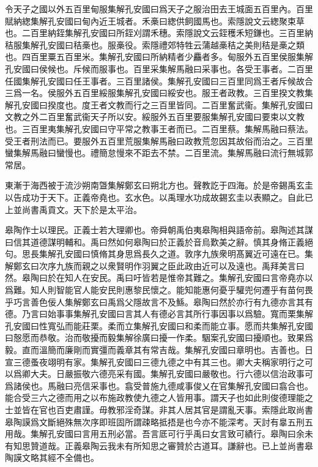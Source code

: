 令天子之國以外五百里甸服集解孔安國曰爲天子之服治田去王城面五百里內。百里賦納緫集解孔安國曰甸內近王城者。禾槀曰緫供飼國馬也。索隱說文云緫聚束草也。二百里納銍集解孔安國曰所銍刈謂禾穗。索隱說文云銍穫禾短鎌也。三百里納秸服集解孔安國曰秸槀也。服槀役。索隱禮郊特牲云蒲越槀秸之美則秸是槀之類也。四百里粟五百里米。集解孔安國曰所納精者少麤者多。甸服外五百里侯服集解孔安國曰侯候也。斥候而服事也。百里采集解馬融曰采事也。各受王事者。二百里任國集解孔安國曰任王事者。三百里諸侯。集解孔安國曰三百里同爲王者斥候故合三爲一名。侯服外五百里綏服集解孔安國曰綏安也。服王者政教。三百里揆文教集解孔安國曰揆度也。度王者文教而行之三百里皆同。二百里奮武衞。集解孔安國曰文教之外二百里奮武衞天子所以安。綏服外五百里要服集解孔安國曰要束以文教也。三百里夷集解孔安國曰守平常之教事王者而已。二百里蔡。集解馬融曰蔡法。受王者刑法而已。要服外五百里荒服集解馬融曰政教荒忽因其故俗而治之。三百里蠻集解馬融曰蠻慢也。禮簡怠慢來不距去不禁。二百里流。集解馬融曰流行無城郭常居。

東漸于海西被于流沙朔南曁集解鄭玄曰朔北方也。聲教訖于四海。於是帝錫禹玄圭以告成功于天下。正義帝堯也。玄水色。以禹理水功成故錫玄圭以表顯之。自此已上並尚書禹貢文。天下於是太平治。

皋陶作士以理民。正義士若大理卿也。帝舜朝禹伯夷皋陶相與語帝前。皋陶述其謀曰信其道德謀明輔和。禹曰然如何皋陶曰於正義於音烏歎美之辭。慎其身脩正義絕句。思長集解孔安國曰慎脩其身思爲長久之道。敦序九族衆明髙翼近可遠在已。集解鄭玄曰次序九族而親之以衆賢明作羽翼之臣此政由近可以及遠也。禹拜美言曰然。皋陶曰於在知人在安民。禹曰吁皆若是惟帝其難之。集解孔安國曰言帝堯亦以爲難。知人則智能官人能安民則惠黎民懷之。能知能惠何憂乎驩兜何遷乎有苗何畏乎巧言善色佞人集解鄭玄曰禹爲父隱故言不及鯀。皋陶曰然於亦行有九德亦言其有德。乃言曰始事事集解孔安國曰言其人有德必言其所行事因事以爲驗。寬而栗集解孔安國曰性寬弘而能莊栗。柔而立集解孔安國曰和柔而能立事。愿而共集解孔安國曰慤愿而恭敬。治而敬擾而毅集解徐廣曰擾一作柔。駰案孔安國曰擾順也。致果爲毅。直而溫簡而廉剛而實彊而義章其有常吉哉。集解孔安國曰章明也。吉善也。日宣三德蚤夜翊明有家。集解孔安國曰三德九德之中有其三也。卿大夫稱家明行之可以爲卿大夫。日嚴振敬六德亮采有國。集解孔安國曰嚴敬也。行六德以信治政事可爲諸侯也。馬融曰亮信采事也。翕受普施九德咸事俊乂在官集解孔安國曰翕合也。能合受三六之德而用之以布施政教使九德之人皆用事。謂天子也如此則俊德理能之士並皆在官也百吏肅謹。毋教邪淫奇謀。非其人居其官是謂亂天事。索隱此取尚書皋陶謨爲文斷絕殊無次序即班固所謂疎略抵捂是也今亦不能深考。天討有辠五刑五用哉。集解孔安國曰言用五刑必當。吾言厎可行乎禹曰女言致可績行。皋陶曰余未有知思贊道哉。正義皋陶云我未有所知思之審贊於古道耳。謙辭也。已上並尚書皋陶謨文略其經不全備也。

